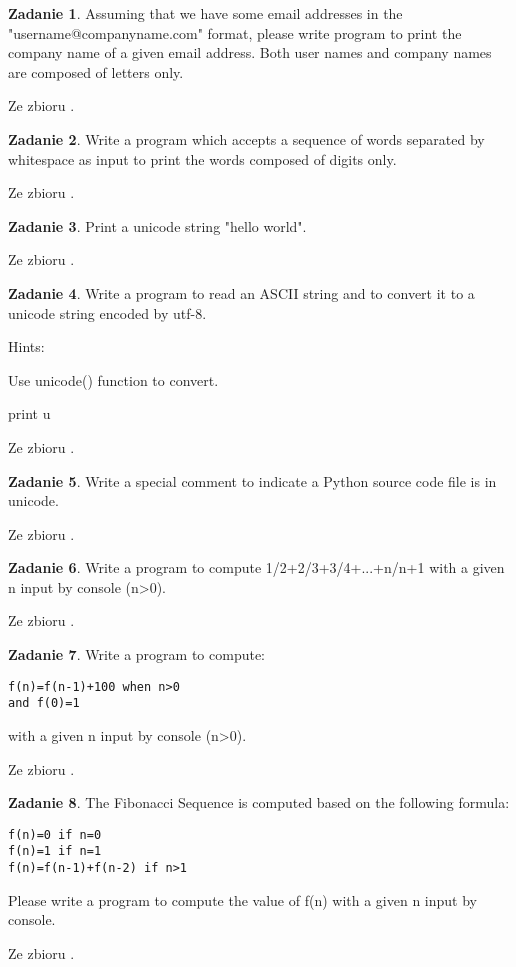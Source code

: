 \documentclass[11pt]{article}
\theoremstyle{definition}
\newtheorem{zadanie}{Zadanie}
\newcommand{\fromA}{\small Ze zbioru \cite{python100}.}
\begin{document}
\begin{zadanie}
Assuming that we have some email addresses in the "username@companyname.com" format, please write program to print the company name of a given email address. Both user names and company names are composed of letters only.

\fromA
\end{zadanie}
\begin{zadanie}
Write a program which accepts a sequence of words separated by whitespace as input to print the words composed of digits only.

\fromA
\end{zadanie}
\begin{zadanie}
Print a unicode string "hello world".

\fromA
\end{zadanie}
\begin{zadanie}
Write a program to read an ASCII string and to convert it to a unicode string encoded by utf-8.

Hints:

Use unicode() function to convert.

print u

\fromA
\end{zadanie}
\begin{zadanie}
Write a special comment to indicate a Python source code file is in unicode.

\fromA
\end{zadanie}
\begin{zadanie}
Write a program to compute 1/2+2/3+3/4+...+n/n+1 with a given n input by console (n>0).

\fromA
\end{zadanie}
\begin{zadanie}
Write a program to compute:

\begin{verbatim}
f(n)=f(n-1)+100 when n>0
and f(0)=1
\end{verbatim}

with a given n input by console (n>0).

\fromA
\end{zadanie}
\begin{zadanie}
The Fibonacci Sequence is computed based on the following formula:

\begin{verbatim}
f(n)=0 if n=0
f(n)=1 if n=1
f(n)=f(n-1)+f(n-2) if n>1
\end{verbatim}

Please write a program to compute the value of f(n) with a given n input by console.

\fromA
\end{zadanie}
\end{document}
